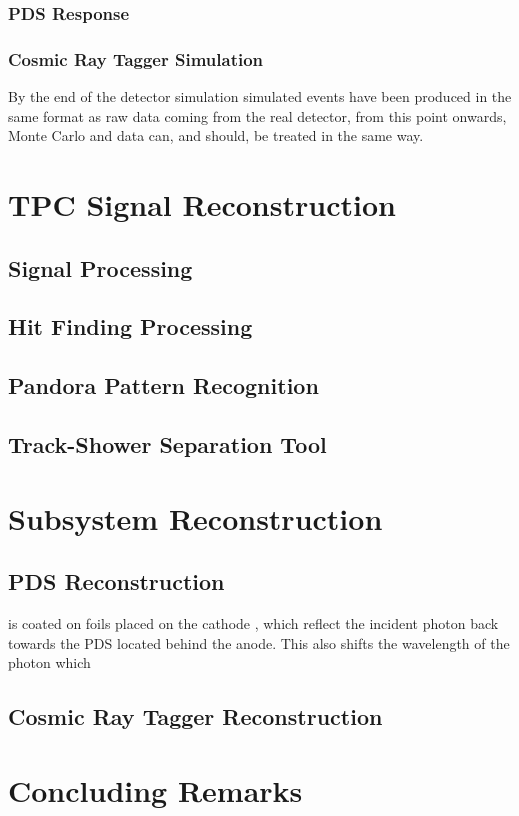 \subsubsection{PDS Response}

\subsubsection{Cosmic Ray Tagger Simulation}
By the end of the detector simulation simulated events have been produced in the
same format as raw data coming from the real detector, from this point onwards,
Monte Carlo and data can, and should, be treated in the same way.

\section{TPC Signal Reconstruction}

\subsection{Signal Processing}

\subsection{Hit Finding Processing}

\subsection{Pandora Pattern Recognition}

\subsection{Track-Shower Separation Tool}

\section{Subsystem Reconstruction}

\subsection{PDS Reconstruction}
is coated on foils placed on the cathode
, which reflect the incident photon back towards the PDS located behind the anode. 
This also shifts the wavelength of the photon which 


\subsection{Cosmic Ray Tagger Reconstruction}


\section{Concluding Remarks}
